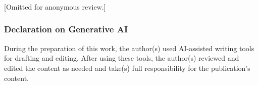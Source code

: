 \documentclass[runningheads]{llncs}
\begin{document}


















\newpage
\begin{credits}
\subsubsection{\ackname} [Omitted for anonymous review.]

\subsubsection{Declaration on Generative AI}
During the preparation of this work, the author(s) used AI-assisted writing tools for
drafting and editing. After using these tools, the author(s) reviewed and edited the
content as needed and take(s) full responsibility for the publication's content.
\end{credits}



\end{document}
